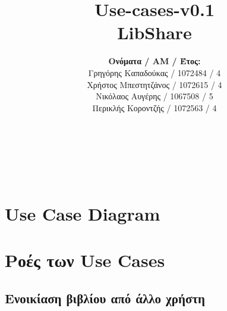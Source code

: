 \documentclass[12pt,a4paper]{article}
\title{Use-cases-v0.1 \\ LibShare}
\author{\textbf{Ονόματα / ΑΜ / Έτος:} \\ Γρηγόρης Καπαδούκας / 1072484 / 4\textdegree \\ Χρήστος Μπεστητζάνος / 1072615 / 4\textdegree \\ Νικόλαος Αυγέρης / 1067508 / 5\textdegree \\ Περικλής Κοροντζής / 1072563 / 4\textdegree}
\begin{document}
\makeatletter
\begin{center}
	\LARGE{\@title} \\
	\pagebreak
	\begin{LARGE}\@author\end{LARGE} \\
\end{center}
\pagebreak

\section{Use Case Diagram}

\section{Ροές των Use Cases}

\subsection{Ενοικίαση βιβλίου από άλλο χρήστη}
\end{document}
